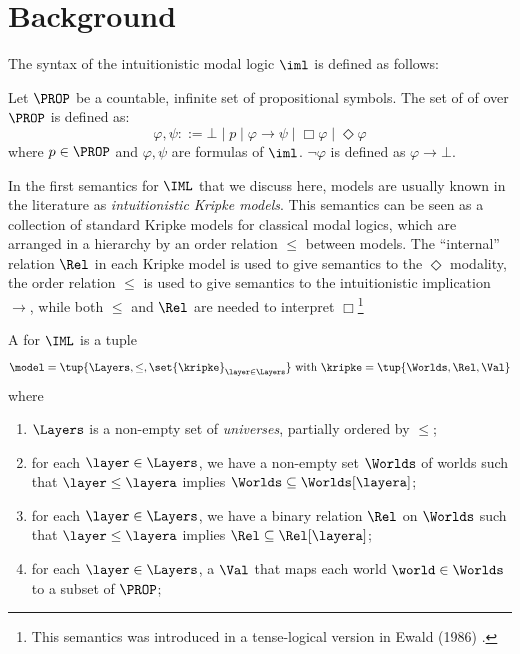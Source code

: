 \section{Background}
\label{sec:background}


The syntax of the intuitionistic modal logic $\iml$  is defined
as follows:

\begin{definition}
  Let $\PROP$ be a countable, infinite set of propositional symbols.
  The set of  of \iml over $\PROP$ is defined as:
$$
\varphi, \psi ::= \bot \mid p 
  \mid \varphi \to \psi 
  \mid \Box \varphi
  \mid \Diamond \varphi
$$
where $p\in \PROP$ and $\varphi, \psi$ are formulas of $\iml$.
$\neg \varphi$ is defined as $\varphi \to \bot$.
\end{definition}

In the first semantics for $\IML$ that we discuss here, models are usually known in the literature as \emph{intuitionistic Kripke models}. This semantics can be seen as a collection of standard Kripke models for classical modal logics, which are arranged in a hierarchy by  an order relation $\le$ between models. The ``internal'' relation $\Rel$ in each Kripke model is used to give semantics to the $\Diamond$ modality, the order relation $\le$ is used to give semantics to the intuitionistic implication $\to$, while both $\le$ and $\Rel$ are needed to interpret $\Box$\footnote{This semantics was introduced in a tense-logical version in Ewald (1986) .}

\begin{definition}
  A  for $\IML$ is a tuple
$$
 \model= \tup{\Layers, \le, \set{\kripke}_{\layer \in \Layers}} \text{ with } 
 \kripke = \tup{\Worlds, \Rel, \Val}
$$
where
\begin{enumerate}
\item  $\Layers$ is a non-empty set of \emph{universes}, partially ordered by $\le$;
\item  for each $\layer\in\Layers$, we have a non-empty set $\Worlds$ of worlds such that $\layer\le\layera$ implies
  $\Worlds\subseteq\Worlds[\layera]$;
\item for each $\layer\in\Layers$, we have a binary relation $\Rel$ on $\Worlds$ such that $\layer\le\layera$ implies
  $\Rel\subseteq\Rel[\layera]$;
\item for each $\layer\in\Layers$, a  $\Val$ that maps
  each world $\world\in\Worlds$ to a subset of $\PROP$;
\end{enumerate}
\end{definition}

